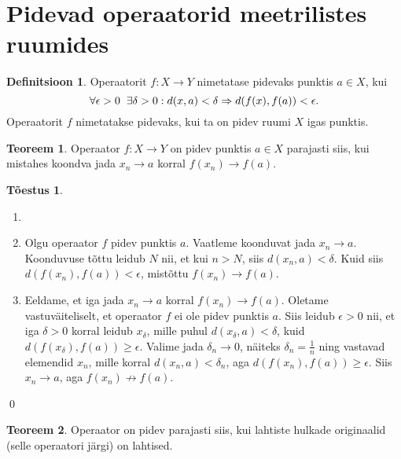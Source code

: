 \documentclass{article}[12pt]
\newcommand{\h}{\hspace{0.2cm}}
\theoremstyle{definition}
\newtheorem{definition}{Definitsioon}[section]
\theoremstyle{definition}
\newtheorem{theorem}{Teoreem}[section]
\theoremstyle{definition}
\theoremstyle{break}
\newtheorem*{toestus}{Tõestus}
\begin{document}
\section{Pidevad operaatorid meetrilistes ruumides}

\begin{definition}
	Operaatorit $f:X\rightarrow Y$ nimetatase pidevaks punktis $a\in X$, kui
	\[
		\forall \epsilon > 0 \h\exists \delta > 0 : d(x,a)<\delta \Rightarrow d(f(x),f(a))<\epsilon.
	\]
	Operaatorit $f$ nimetatakse pidevaks, kui ta on pidev ruumi $X$ igas punktis.
\end{definition}

\begin{theorem}
	Operaator $f:X\rightarrow Y$ on pidev punktis $a\in X$ parajasti siis, kui mistahes koondva jada $x_n\rightarrow a$ korral $f(x_n)\rightarrow f(a)$.
\end{theorem}

\begin{toestus}
	\begin{enumerate}
		\item[]
		\item Olgu operaator $f$ pidev punktis $a$. 
		Vaatleme koonduvat jada $x_n\rightarrow a$.
		Koonduvuse tõttu leidub $N$ nii, et kui $n > N$, siis $d(x_n,a)<\delta$.
		Kuid siis $d(f(x_n),f(a))<\epsilon$, mistõttu $f(x_n)\rightarrow f(a)$.
		\item Eeldame, et iga jada $x_n\rightarrow a$ korral $f(x_n)\rightarrow f(a)$.
		Oletame vastuväiteliselt, et operaator $f$ ei ole pidev punktis $a$. Siis leidub $\epsilon > 0$ nii, et iga $\delta > 0$ korral leidub $x_\delta$, mille puhul $d(x_\delta, a)<\delta$, kuid $d(f(x_\delta), f(a))\geq \epsilon$. 
		Valime jada $\delta_n\rightarrow 0$, näiteks $\delta_n = \frac{1}{n}$ ning vastavad elemendid $x_n$, mille korral $d(x_n,a)<\delta_n$, aga $d(f(x_n),f(a))\geq\epsilon$.
		Siis $x_n\rightarrow a$, aga $f(x_n)\not\rightarrow f(a)$.
	\end{enumerate}
	\qed
\end{toestus}

\begin{theorem}
	Operaator on pidev parajasti siis, kui lahtiste hulkade originaalid (selle operaatori järgi) on lahtised.
\end{theorem}
\end{document}
